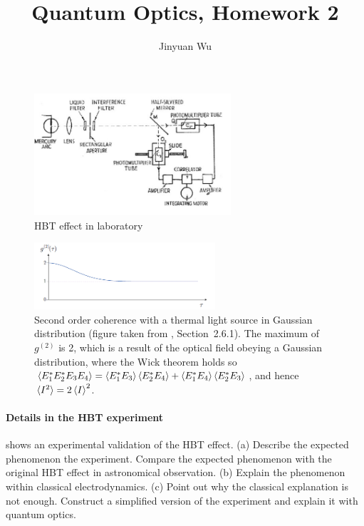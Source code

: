 \documentclass[hyperref, a4paper]{article}
\title{Quantum Optics, Homework 2}
\author{Jinyuan Wu}
\begin{document}
\maketitle

\begin{figure}
    \centering
    \includegraphics[width=0.65\textwidth]{hbt-lab.png}
    \caption{HBT effect in laboratory}
    \label{fig:hbt-lab}
\end{figure}

\begin{figure}
    \centering
    \includegraphics[width=0.6\textwidth]{thermal-state-g2.PNG}
    \caption{Second order coherence with a thermal light source in Gaussian distribution (figure taken from \cite{optical-note-steck}, Section~2.6.1).
    The maximum of $g^{(2)}$ is 2, which is a result of the optical field obeying a Gaussian distribution, where the Wick theorem holds so $\expval{E^*_1 E^*_2 E_3 E_4} = \expval{E^*_1 E_3} \expval{E^*_2 E_4} + \expval{E^*_1 E_4} \expval{E^*_2 E_3}$, and hence $\expval*{I^2} = 2 \expval{I}^2$.}
    \label{fig:thermal-hbt}
\end{figure}

\paragraph{Details in the HBT experiment}  shows an experimental validation of the HBT effect. 
(a) Describe the expected phenomenon the experiment. Compare the expected phenomenon with the original HBT effect in astronomical observation.
(b) Explain the phenomenon within classical electrodynamics.
(c) Point out why the classical explanation is not enough. Construct a simplified version of the experiment and explain it with quantum optics.
\end{document}
